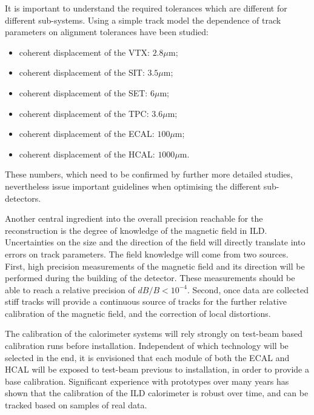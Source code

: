 It is important to understand the required tolerances which are different for different sub-systems. Using a simple track model the dependence of track parameters on alignment tolerances have been studied: 
\begin{itemize}
    \item coherent displacement of the VTX: $2.8 \mu$m;
    \item coherent displacement of the SIT: $3.5 \mu$m;
    \item coherent displacement of the SET: $6 \mu$m;
    \item coherent displacement of the TPC: $3.6 \mu$m;
    \item coherent displacement of the ECAL: $100 \mu$m;
    \item coherent displacement of the HCAL: $1000 \mu$m.
\end{itemize}
These numbers, which need to be confirmed by further more detailed studies, nevertheless issue important guidelines when optimising the different sub-detectors. 

Another central ingredient into the overall precision reachable for the reconstruction is the degree of knowledge of the magnetic field in ILD. Uncertainties on the size and the direction of the field will directly translate into errors on track parameters. The field knowledge will come from two sources. First, high precision measurements of the magnetic field and its direction will be performed during the building of the detector. These measurements should be able to reach a relative precision of $dB/B < 10^{-4}$.
Second, once data are collected stiff tracks will provide a continuous source of tracks for the further relative calibration of the magnetic field, and the correction of local distortions. 

The calibration of the calorimeter systems will rely strongly on test-beam based calibration runs before installation. Independent of which technology will be selected in the end, it is envisioned that each module of both the ECAL and HCAL will be exposed to test-beam previous to installation, in order to provide a base calibration. Significant experience with prototypes over many years has shown that the calibration of the ILD calorimeter is robust over time, and can be tracked based on samples of real data. 

